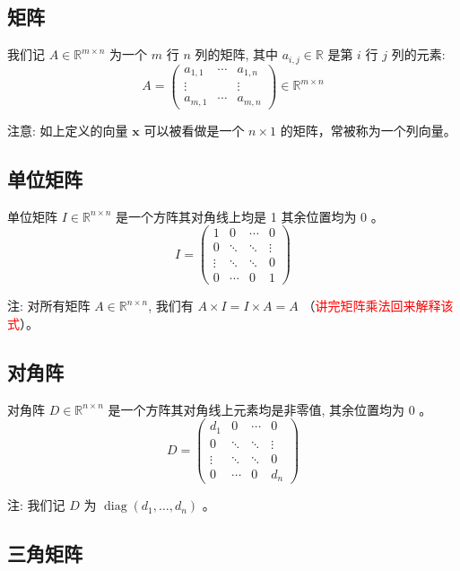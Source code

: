 \documentclass[lang=cn,newtx,10pt,scheme=chinese]{elegantbook}
\begin{document}
\subsection{矩阵}
我们记 $A \in \mathbb{R}^{m \times n}$ 为一个 $m$ 行 $n$ 列的矩阵, 其中 $a_{i, j} \in \mathbb{R}$ 是第 $i$ 行 $j$ 列的元素:
$$
A=\left(\begin{array}{ccc}
a_{1,1} & \cdots & a_{1, n} \\
\vdots & & \vdots \\
a_{m, 1} & \cdots & a_{m, n}
\end{array}\right) \in \mathbb{R}^{m \times n}
$$

注意: 如上定义的向量 $\boldsymbol{x}$ 可以被看做是一个 $n \times 1$ 的矩阵，常被称为一个列向量。


\subsection{单位矩阵}

单位矩阵 $I \in \mathbb{R}^{n \times n}$ 是一个方阵其对角线上均是 1 其余位置均为 0 。
$$
I=\left(\begin{array}{cccc}
1 & 0 & \cdots & 0 \\
0 & \ddots & \ddots & \vdots \\
\vdots & \ddots & \ddots & 0 \\
0 & \cdots & 0 & 1
\end{array}\right)
$$

注: 对所有矩阵 $A \in \mathbb{R}^{n \times n}$, 我们有 $A \times I=I \times A=A$ （\textcolor{red}{讲完矩阵乘法回来解释该式}）。


\subsection{对角阵}

对角阵 $D \in \mathbb{R}^{n \times n}$ 是一个方阵其对角线上元素均是非零值, 其余位置均为 0 。
$$
D=\left(\begin{array}{cccc}
d_1 & 0 & \cdots & 0 \\
0 & \ddots & \ddots & \vdots \\
\vdots & \ddots & \ddots & 0 \\
0 & \cdots & 0 & d_n
\end{array}\right)
$$

注: 我们记 $D$ 为 $\operatorname{diag}\left(d_1, \ldots, d_n\right)$ 。

\subsection{三角矩阵}
\end{document}
